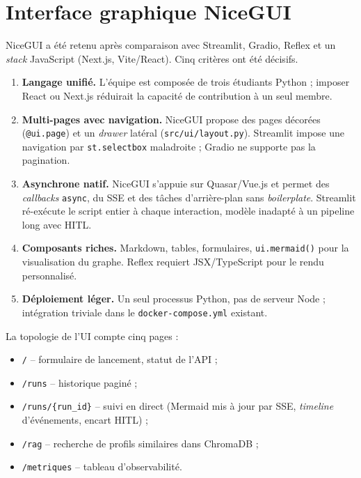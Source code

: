 

\section{Interface graphique NiceGUI}

NiceGUI a été retenu après comparaison avec Streamlit, Gradio, Reflex et un \textit{stack} JavaScript (Next.js, Vite/React). Cinq critères ont été décisifs.

\begin{enumerate}
\item \textbf{Langage unifié.} L'équipe est composée de trois étudiants Python ; imposer React ou Next.js réduirait la capacité de contribution à un seul membre.
\item \textbf{Multi-pages avec navigation.} NiceGUI propose des pages décorées (\texttt{@ui.page}) et un \textit{drawer} latéral (\texttt{src/ui/layout.py}). Streamlit impose une navigation par \texttt{st.selectbox} maladroite ; Gradio ne supporte pas la pagination.
\item \textbf{Asynchrone natif.} NiceGUI s'appuie sur Quasar/Vue.js et permet des \textit{callbacks} \texttt{async}, du SSE et des tâches d'arrière-plan sans \textit{boilerplate}. Streamlit ré-exécute le script entier à chaque interaction, modèle inadapté à un pipeline long avec HITL.
\item \textbf{Composants riches.} Markdown, tables, formulaires, \texttt{ui.mermaid()} pour la visualisation du graphe. Reflex requiert JSX/TypeScript pour le rendu personnalisé.
\item \textbf{Déploiement léger.} Un seul processus Python, pas de serveur Node ; intégration triviale dans le \texttt{docker-compose.yml} existant.
\end{enumerate}

La topologie de l'UI compte cinq pages :
\begin{itemize}[noitemsep]
\item \texttt{/} -- formulaire de lancement, statut de l'API ;
\item \texttt{/runs} -- historique paginé ;
\item \texttt{/runs/\{run\_id\}} -- suivi en direct (Mermaid mis à jour par SSE, \textit{timeline} d'événements, encart HITL) ;
\item \texttt{/rag} -- recherche de profils similaires dans ChromaDB ;
\item \texttt{/metriques} -- tableau d'observabilité.
\end{itemize}

